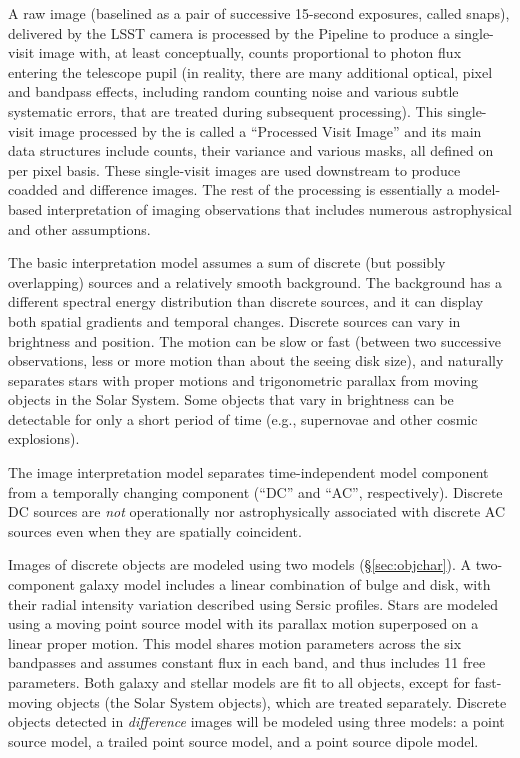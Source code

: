 \documentclass[SE,lsstdraft,toc]{lsstdoc}
\begin{document}
 A raw image (baselined as a pair of successive 15-second exposures, called snaps),
delivered by the LSST camera is processed by the   Pipeline to produce a single-visit image with, at least
conceptually, counts proportional to photon flux entering the
telescope pupil (in reality, there are many additional optical, pixel and
bandpass effects, including random counting noise and various subtle
systematic errors, that are treated during subsequent processing).
This single-visit image processed by the   is called a ``Processed Visit Image'' and its main data structures include counts, their variance and
various masks, all defined on per pixel basis. 
These single-visit images are used downstream to produce coadded and difference
images. The rest of the processing is essentially a model-based interpretation
of imaging observations that includes numerous astrophysical and other
assumptions.

The basic interpretation model assumes a sum of discrete (but possibly overlapping)
sources and a relatively smooth background. The background has a different
spectral energy distribution than discrete sources, and it can display both
spatial gradients and temporal changes. Discrete sources can vary
in brightness and position. The motion can be slow or fast (between two successive observations,
less or more motion than about the seeing disk size), and naturally separates stars
with proper motions and trigonometric parallax from moving objects in the Solar System.
Some objects that vary in brightness can be detectable for only a short period of time
(e.g., supernovae and other cosmic explosions).

The image interpretation model separates time-independent model
component from a temporally changing component (``DC'' and ``AC'',
respectively). Discrete DC sources are \textit{not} operationally nor astrophysically
associated with discrete AC sources even when they are spatially coincident.

Images  of discrete objects are
modeled using two models (\S\ref{sec:objchar}). A two-component galaxy model includes a linear
combination of bulge and disk, with their radial intensity variation described using
Sersic profiles.
Stars are modeled using a moving point source model with its parallax motion
superposed on a linear proper motion. This model shares motion parameters across
the six bandpasses and assumes constant flux in each band, and thus includes
11 free parameters. Both galaxy and stellar models are fit to all objects, except
for fast-moving objects (the Solar System objects), which are treated separately.
Discrete objects detected in \emph{difference} images will be modeled using three models:
a point source model, a trailed point source model, and a point source dipole model.
\end{document}
